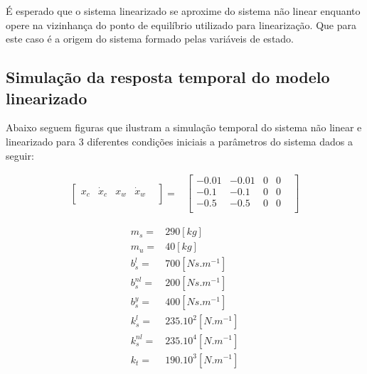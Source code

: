 \documentclass[a4paper]{ifacconf}
\begin{document}
    É esperado que o  sistema linearizado se aproxime do sistema não linear enquanto opere na vizinhança do ponto de equilíbrio utilizado para linearização. Que para este caso é a origem do sistema formado pelas variáveis de estado.
    \subsection{Simulação da resposta temporal do modelo linearizado}
    Abaixo seguem figuras que ilustram a simulação temporal do sistema não linear e linearizado para 3 diferentes condições iniciais a parâmetros do sistema dados a seguir: 
    
    \begin{equation*} 
    \begin{split}
        \begin{bmatrix}
            x_c & \dot{x}_c & x_w & \dot{x}_w & \\
        \end{bmatrix}=
    \end{split}
    \begin{split}
        \begin{bmatrix}
            -0.01& -0.01& 0& 0& \\
             -0.1&  -0.1& 0& 0& \\
             -0.5&  -0.5& 0& 0&\\
        \end{bmatrix}
    \end{split}
    \end{equation*}
    
   \begin{equation} 
        \begin{split} 
        m_s =   & 290     [kg]\\
        m_u =   & 40      [kg]\\
        b^{l}_s =  & 700  [Ns.m^{-1}]\\
        b^{nl}_s =  & 200      [Ns.m^{-1}]\\
        b^{y}_s=  & 400      [Ns.m^{-1}]\\
        k^{l}_s =  & 235.10^2 [N.m^{-1}]\\
        k^{nl}_s = & 235.10^4 [N.m^{-1}]\\
        k_t =  & 190.10^3 [N.m^{-1}]\\
        \end{split}
    \end{equation}
\end{document}
